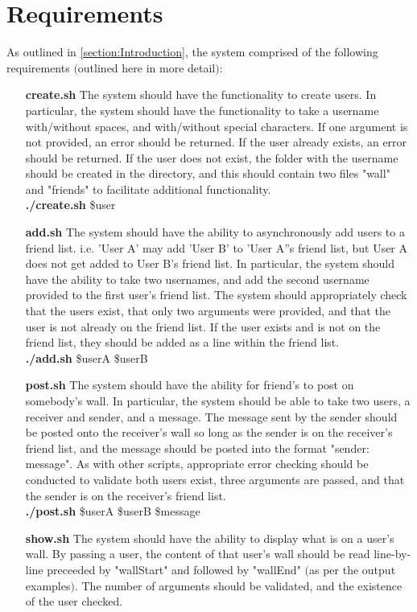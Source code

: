 \documentclass[11pt]{article}
\theoremstyle{plain}
\theoremstyle{definition}
\begin{document}
\section{Requirements}\label{section:Requirements}
As outlined in \ref{section:Introduction}, the system comprised of the following requirements $($outlined here in more detail$)$:

\begin{itemize}
	\item[\textbf{create.sh}] The system should have the functionality to create users. In particular, the system should have the functionality to take a username with/without spaces, and with/without special characters. If one argument is not provided, an error should be returned. If the user already exists, an error should be returned. If the user does not exist, the folder with the username should be created in the directory, and this should contain two files "wall" and "friends" to facilitate additional functionality.\\
	\textbf{./create.sh} \$user
	\item[\textbf{add.sh}] The system should have the ability to asynchronously add users to a friend list. i.e. 'User A' may add 'User B' to 'User A''s friend list, but User A does not get added to User B's friend list. In particular, the system should have the ability to take two usernames, and add the second username provided to the first user's friend list. The system should appropriately check that the users exist, that only two arguments were provided, and that the user is not already on the friend list. If the user exists and is not on the friend list, they should be added as a line within the friend list.\\
	\textbf{./add.sh} \$userA \$userB
	\item[\textbf{post.sh}]  The system should have the ability for friend's to post on somebody's wall. In particular, the system should be able to take two users, a receiver and sender, and a message. The message sent by the sender should be posted onto the receiver's wall so long as the sender is on the receiver's friend list, and the message should be posted into the format "sender: message". As with other scripts, appropriate error checking should be conducted to validate both users exist, three arguments are passed, and that the sender is on the receiver's friend list.\\
	\textbf{./post.sh} \$userA \$userB \$message
	\item[\textbf{show.sh}]  The system should have the ability to display what is on a user's wall. By passing a user, the content of that user's wall should be read line-by-line preceeded by "wallStart" and followed by "wallEnd" $($as per the output examples$)$. The number of arguments should be validated, and the existence of the user checked.\\

\end{itemize}
\end{document}
